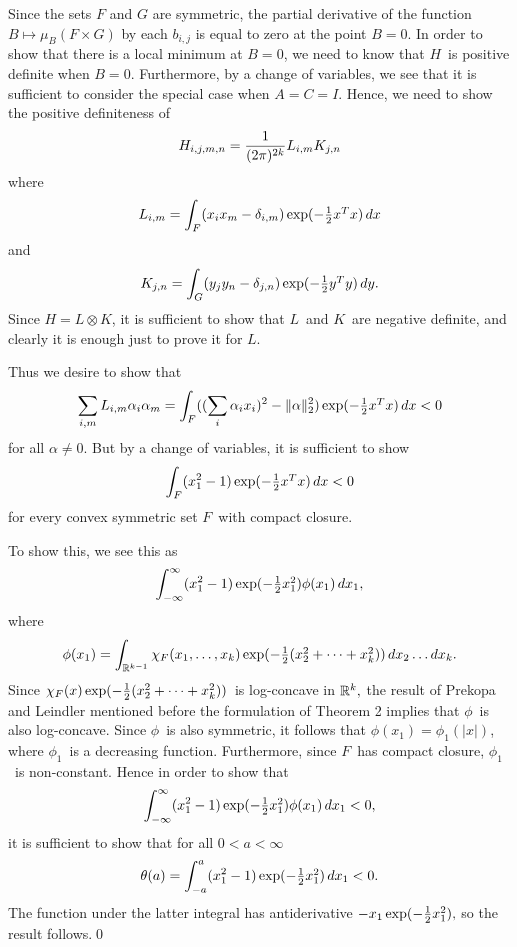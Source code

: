 Since the sets $F$ and $G$ are symmetric, the partial derivative 
of the function $B\mapsto \mu_{B}(F \times G)$ by each $b_{i,j}$
is equal to zero at the point $B=0.$
In order to show that there is a local minimum at $B=0$, we need to know
that $H$\ is positive definite when $B = 0$.  Furthermore, by a change
of variables, we see that it is sufficient to consider the special
case when $A = C = I$.  Hence, we need to show
the positive definiteness of
$$ H_{i,j,m,n} = {1\over (2 \pi)^{2k}} L_{i,m} K_{j,n} $$
where 
$$ L_{i,m} = \int_F (x_i x_m - \delta_{i,m}) \exp(-\textstyle{1\over2} x^Tx) \, dx $$
and
$$ K_{j,n} = \int_G (y_j y_n - \delta_{j,n}) \exp(-\textstyle{1\over2} y^Ty) \, dy . $$
Since $H = L \otimes K$, it is sufficient to show that $L$\ and $K$\
are negative definite, and clearly it is enough just to prove it for
$L$.

Thus we desire to show that 
$$ \sum_{i,m} L_{i,m} \alpha_i \alpha_m
   =
   \int_F ((\sum_i \alpha_i x_i)^2 - \|\alpha\|_2^2) \exp(-\textstyle{1\over2} x^Tx) \, dx
   < 0 $$
for all $\alpha \ne 0$.  But by a change of variables, it is sufficient
to show 
$$ \int_F (x_1^2 - 1) \exp(-\textstyle{1\over2} x^Tx) \, dx < 0 $$
for every convex symmetric set $F$\ with compact closure. 

To show this, we see this as
$$ \int_{-\infty}^\infty (x_1^2 - 1) \exp(-\textstyle{1\over2} x_1^2) \phi(x_1) \, dx_1 ,$$
where
$$ \phi(x_1) = \int_{\Bbb R^{k-1}} \chi_F(x_1,\dots,x_k) 
\exp(-\textstyle{1\over2}(x_2^2+\dots+x_k^2)) \, dx_2\dots dx_k .$$
Since $\chi_F(x) \exp(-\textstyle{1\over2}(x_2^2+\dots+x_k^2))$\ is log-concave
in $\Bbb R^k,$ the
result of Prekopa and Leindler mentioned before the formulation
of Theorem 2 implies that $\phi$\ is also log-concave.  Since
$\phi$\ is also symmetric, it follows that
$\phi(x_1) = \phi_1(|x|)$, where $\phi_1$\ is a decreasing function. 
Furthermore, since $F$\ has compact closure, $\phi_1$\ is non-constant.
Hence in order to show that
$$ \int_{-\infty}^\infty (x_1^2 - 1) \exp(-\textstyle{1\over2} x_1^2) \phi(x_1) \, dx_1 < 0,$$
it is sufficient to show that for all $0<a<\infty$
$$ \theta(a) = \int_{-a}^a (x_1^2 - 1) \exp(-\textstyle{1\over2} x_1^2) \, dx_1 < 0 .$$
The function under the latter integral has antiderivative
$-x_1 \exp(- \textstyle{1\over2} x_1^2),$ so the result follows.\qed \enddemo

\bigbreak


